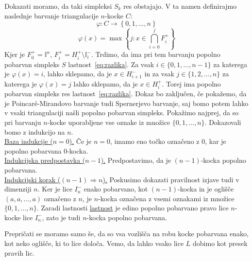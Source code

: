 \documentclass[mat1]{fmfdelo}
\newcommand{\I}{\mathbb I}
\newcommand{\0}{\underline{0}}
\begin{document}
\begin{dokaz}
Dokazati moramo, da taki simpleksi $S_k$ res obstajajo. V ta namen definirajmo naslednje barvanje triangulacije $n$-kocke $C$:
$$\varphi : C \to \left \{ 0, 1, \dots, n \right \}$$
$$\varphi(x) = \max \left \{ j : x \in \bigcap_{i=0}^j F_i^+\right \}$$
Kjer je $ F_0^+ = \I^n$, $ F_i^+ =  H_i^+ \setminus \I_i^-$.
Trdimo, da ima pri tem barvanju popolno pobarvan simpleks $S$ lastnost~\eqref{eq:razlika}. Za vsak $i \in \{0, 1, \dots, n-1 \}$ za katerega je $\varphi(x) = i$, lahko sklepamo, da je $x \in H_{i+1}^-$ in za vsak $j \in \{ 1, 2, \dots, n \}$ za katerega je $\varphi(x) = j$ lahko sklepamo, da je $x \in H_i^+$. Torej ima popolno pobarvan simpleks res lastnost~\eqref{eq:razlika}. Dokaz bo zaključen, če pokažemo, da je Poincar\'e-Mirandovo barvanje tudi Spernerjevo barvanje, saj bomo potem lahko v vsaki triangulaciji našli popolno pobarvan simpleks.
Pokažimo najprej, da so pri barvanju $n$-kocke uporabljene vse oznake iz množice $\{ 0, 1, \dots, n \}$. Dokazovali bomo z indukcijo na $n$.\\
\underline{Baza indukcije ($n = 0$).}
Če je $n=0$, imamo eno točko označeno z $0$, kar je popolno pobarvana $0$-kocka.\\
\underline{Indukcijska predpostavka ($n - 1$).}
Predpostavimo, da je $(n-1)$-kocka popolno pobarvana. \\
\underline{Indukcijski korak ($(n - 1) \Longrightarrow n$).}
Poskusimo dokazati pravilnost izjave tudi v dimenziji $n$. Ker je lice $I_n^-$ enako pobarvano, kot $(n-1)$-kocka in je oglišče $(a, a, \dots, a)$ označeno z $n$, je $n$-kocka označena z vsemi oznakami iz množice $\{ 0, 1, \dots, n \}$. Zaradi lastnosti \underline{lastnost} je edino popolno pobarvano pravo lice $n$-kocke lice $I_n^-$, zato je tudi $n$-kocka popolno pobarvana.

Prepričati se moramo samo še, da so vsa vozlišča na robu kocke pobarvana enako, kot neko oglišče, ki to lice določa. Vemo, da lahko vsako lice $L$ dobimo kot presek pravih lic.





\end{dokaz}
\end{document}
